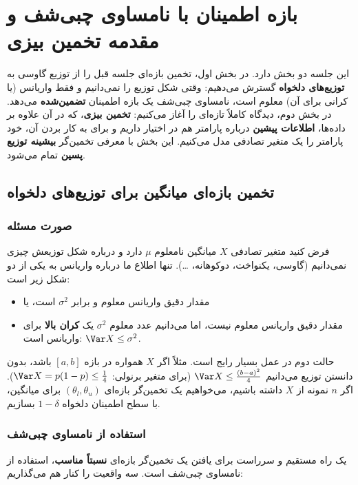 \chapter{بازه اطمینان با نامساوی چبی‌شف و مقدمه تخمین بیزی}

این جلسه دو بخش دارد. در بخش اول، تخمین بازه‌ای جلسه قبل را از توزیع گاوسی به \textbf{توزیع‌های دلخواه} گسترش می‌دهیم: وقتی شکل توزیع را نمی‌دانیم و فقط واریانس (یا کرانی برای آن) معلوم است، نامساوی چبی‌شف یک بازه اطمینان \textbf{تضمین‌شده} می‌دهد. در بخش دوم، دیدگاه کاملاً تازه‌ای را آغاز می‌کنیم: \textbf{تخمین بیزی}، که در آن علاوه بر داده‌ها، \textbf{اطلاعات پیشین} درباره پارامتر هم در اختیار داریم و برای به کار بردن آن، خود پارامتر را یک متغیر تصادفی مدل می‌کنیم. این بخش با معرفی تخمین‌گر \textbf{بیشینه توزیع پسین } تمام می‌شود.

\section{تخمین بازه‌ای میانگین برای توزیع‌های دلخواه}

\subsection{صورت مسئله}
فرض کنید متغیر تصادفی $X$ میانگین نامعلوم $\mu$ دارد و درباره شکل توزیعش چیزی نمی‌دانیم (گاوسی، یکنواخت، دوکوهانه، \ldots). تنها اطلاع ما درباره واریانس به یکی از دو شکل زیر است:
\begin{itemize}
\item مقدار دقیق واریانس معلوم و برابر $\sigma^2$ است، یا
\item مقدار دقیق واریانس معلوم نیست، اما می‌دانیم عدد معلوم $\sigma^2$ یک \textbf{کران بالا} برای واریانس است: $\Var X\le\sigma^2$.
\end{itemize}
حالت دوم در عمل بسیار رایج است. مثلاً اگر $X$ همواره در بازه $[a,b]$ باشد، بدون دانستن توزیع می‌دانیم $\Var X\le\frac{(b-a)^2}{4}$ (برای متغیر برنولی: $\Var X=p(1-p)\le\frac14$). اگر $n$ نمونه  از $X$ داشته باشیم، می‌خواهیم یک تخمین‌گر بازه‌ای $(\theta_l,\theta_u)$ برای میانگین، با سطح اطمینان دلخواه $1-\delta$ بسازیم.

\subsection{استفاده از نامساوی چبی‌شف}
یک راه مستقیم و سرراست برای یافتن یک تخمین‌گر بازه‌ای \textbf{نسبتاً مناسب}، استفاده از نامساوی چبی‌شف است. سه واقعیت را کنار هم می‌گذاریم:

